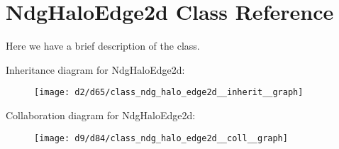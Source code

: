 \hypertarget{class_ndg_halo_edge2d}{}\section{Ndg\+Halo\+Edge2d Class Reference}
\label{class_ndg_halo_edge2d}


Here we have a brief description of the class.  




Inheritance diagram for Ndg\+Halo\+Edge2d\+:
\nopagebreak
\begin{figure}[H]
\begin{center}
\leavevmode
\texttt{[image: d2/d65/class\_ndg\_halo\_edge2d\_\_inherit\_\_graph]}
\end{center}
\end{figure}


Collaboration diagram for Ndg\+Halo\+Edge2d\+:
\nopagebreak
\begin{figure}[H]
\begin{center}
\leavevmode
\texttt{[image: d9/d84/class\_ndg\_halo\_edge2d\_\_coll\_\_graph]}
\end{center}
\end{figure}
